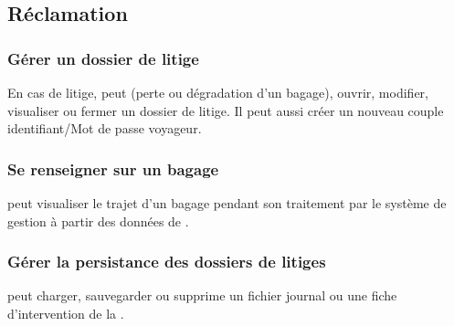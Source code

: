 \subsection{Réclamation}

\subsubsection{Gérer un dossier de litige}
En cas de litige,   peut (perte ou dégradation d'un bagage), ouvrir, modifier, visualiser ou fermer un dossier de litige. Il peut aussi créer un nouveau couple identifiant/Mot de passe voyageur.

\subsubsection	{Se renseigner sur un bagage}
 peut visualiser le trajet d'un bagage pendant son traitement par le système de gestion à partir des données de .

\subsubsection{Gérer la persistance des dossiers de litiges}
 peut charger, sauvegarder ou supprime un fichier journal ou une fiche d'intervention de la .

